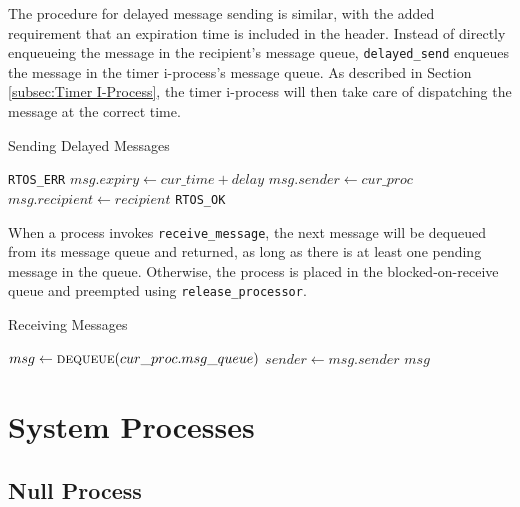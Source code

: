 \documentclass[12pt]{report}
\begin{document}
The procedure for delayed message sending is similar, with the added requirement that an expiration time is included in the header. Instead of directly enqueueing the message in the recipient's message queue, \texttt{delayed_send} enqueues the message in the timer i-process's message queue. As described in Section \ref{subsec:Timer I-Process}, the timer i-process will then take care of dispatching the message at the correct time.\\

\begin{algorithm}
\caption{Sending Delayed Messages}
\begin{algorithmic}[1]
        \State \Return \texttt{RTOS_ERR}
    \EndIf
    \State $msg.expiry \leftarrow cur\_time + delay$
    \State $msg.sender \leftarrow cur\_proc$
    \State $msg.recipient \leftarrow recipient$
    \State {}
    \State \Return \texttt{RTOS_OK}
\EndProcedure
\end{algorithmic}
\end{algorithm}

When a process invokes \texttt{receive_message}, the next message will be dequeued from its message queue and returned, as long as there is at least one pending message in the queue. Otherwise, the process is placed in the blocked-on-receive queue and preempted using \texttt{release_processor}.\\

\begin{algorithm}
\caption{Receiving Messages}
\begin{algorithmic}[1]
        \State {}
        \State {}
    \EndWhile
    \State $msg \leftarrow \Call{dequeue}{cur\_proc.msg\_queue}$
    \State $sender \leftarrow msg.sender$
    \State \Return $msg$
\EndProcedure
\end{algorithmic}
\end{algorithm}

\section{System Processes}

\subsection{Null Process}
\end{document}

